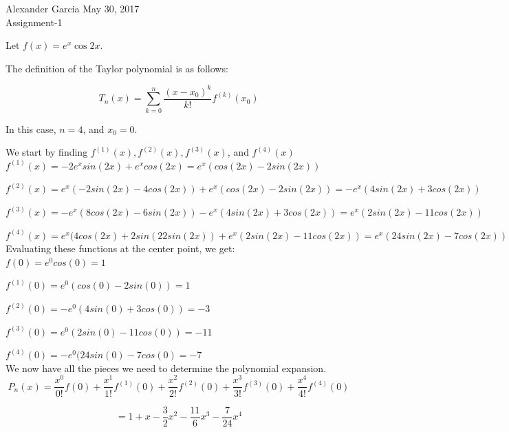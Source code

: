 % 




\bc Alexander Garcia \hfill May 30, 2017 \\ Assignment-1\ec

\bigskip

\benum

\item Let $f(x) = e^{x}\cos {2x}.$
\benum
\item

	The definition of the Taylor polynomial is as follows:

	$$T_n(x) = \sum_{k=0}^{n}{\frac{(x-x_0)^k}{k!}f^{(k)}(x_0)}$$

	In this case, $n=4$, and $x_0 = 0$.

	We start by finding $f^{(1)}(x), f^{(2)}(x), f^{(3)}(x)$, and $f^{(4)}(x)$ \\

	$f^{(1)}(x) = -2e^xsin(2x)+e^xcos(2x) = e^x(cos(2x)-2sin(2x))$

	$f^{(2)}(x) = e^x(-2sin(2x)-4cos(2x))+e^x(cos(2x)-2sin(2x)) = -e^x(4sin(2x)+3cos(2x))$

	$f^{(3)}(x) = -e^x(8cos(2x)-6sin(2x)) - e^x(4sin(2x)+3cos(2x)) = e^x(2sin(2x)-11cos(2x))$

	$f^{(4)}(x) = e^x(4cos(2x)+2sin(22sin(2x)) + e^x(2sin(2x)-11cos(2x)) = e^x(24sin(2x)-7cos(2x))$ \\

	Evaluating these functions at the center point, we get: \\

	$f(0) = e^0cos(0) = 1$

	$f^{(1)}(0) = e^0(cos(0)-2sin(0)) = 1$

	$f^{(2)}(0) = -e^0(4sin(0)+3cos(0)) = -3$

	$f^{(3)}(0) = e^0(2sin(0)-11cos(0)) = -11$

	$f^{(4)}(0) = -e^0(24sin(0)-7cos(0) = -7$ \\

	We now have all the pieces we need to determine the polynomial expansion. \\

	$$P_n(x) = \frac{x^0}{0!} f(0) + \frac{x^1}{1!} f^{(1)}(0) + \frac{x^2}{2!} f^{(2)}(0) +
	\frac{x^3}{3!} f^{(3)}(0) + \frac{x^4}{4!} f^{(4)}(0)$$

	$$= 1+x-\frac{3}{2} x^2 - \frac{11}{6} x^3 - \frac{7}{24} x^4$$ \\


